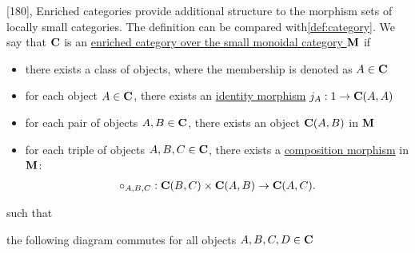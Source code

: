 \begin{definition}\label{def:enriched_category}\cite{MacLane1994}[180],\cite{nLab:enriched_category}
  Enriched categories provide additional structure to the morphism sets of locally small categories. The definition can be compared with\cref{def:category}. We say that $\operatorname{\mathbf{C}}$ is an \uline{enriched category over the small monoidal category $\operatorname{\mathbf{M}}$} if
  \begin{itemize}
    \item there exists a class of objects, where the membership is denoted as $A \in \operatorname{\mathbf{C}}$
    \item for each object $A \in \operatorname{\mathbf{C}}$, there exists an \uline{identity morphism} $j_A: 1 \to \operatorname{\mathbf{C}}(A, A)$
    \item for each pair of objects $A, B \in \operatorname{\mathbf{C}}$, there exists an object $\operatorname{\mathbf{C}}(A, B)$ in $\operatorname{\mathbf{M}}$
    \item for each triple of objects $A, B, C \in \operatorname{\mathbf{C}}$, there exists a \uline{composition morphism} in $\operatorname{\mathbf{M}}$:
    \begin{align*}
      \circ_{A,B,C}: {\operatorname{\mathbf{C}}}(B, C) \times {\operatorname{\mathbf{C}}}(A, B) \to {\operatorname{\mathbf{C}}}(A, C).
    \end{align*}
  \end{itemize}
  such that
  \begin{defenum}
    \item the following diagram commutes for all objects $A, B, C, D \in \operatorname{\mathbf{C}}$
    \begin{center}
    \end{center}


\end{defenum}
\end{definition}
